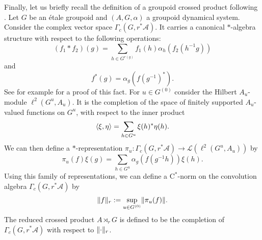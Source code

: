 	Finally, let us briefly recall the definition of a groupoid crossed product	following \cite{MR1900993}.
	Let $G$ be an étale groupoid and $(A,G,\alpha)$ a groupoid dynamical system. Consider the complex vector space $\Gamma_c(G,r^*\mathcal{A})$. It carries a canonical $*$-algebra structure with respect to the following operations:
	$$(f_1\ast f_2)(g)=\sum\limits_{h\in G^{r(g)}} f_1(h)\alpha_h(f_2(h^{-1}g))$$
	and
	$$f^*(g)=\alpha_g(f(g^{-1})^*).$$
	See for example \cite[Proposition~4.4]{MR2547343} for a proof of this fact.
	For $u\in G^{(0)}$ consider the Hilbert $A_u$-module $\ell^2(G^u,A_u)$. It is the completion of the space of finitely supported $A_u$-valued functions on $G^u$, with respect to the inner product 
	$$\langle \xi,\eta\rangle=\sum\limits_{h\in G^u}\xi(h)^*\eta(h).$$
	We can then define a $*$-representation $\pi_u:\Gamma_c(G,r^*\mathcal{A})\rightarrow \mathcal{L}(\ell^2(G^u,A_u))$ by
	$$\pi_u(f)\xi(g)=\sum\limits_{h\in G^u}\alpha_g(f(g^{-1}h))\xi(h).$$
	Using this family of representations, we can define a $\mathrm{C}^*$-norm on the convolution algebra $\Gamma_c(G,r^*\mathcal{A})$ by
	$$\lVert f\rVert_r:=\sup\limits_{u\in G^{(0)}}\lVert\pi_u(f)\rVert.$$
	The reduced crossed product $A\rtimes_r G$ is defined to be the completion of $\Gamma_c(G,r^*\mathcal{A})$ with respect to $\lVert\cdot\rVert_r$.